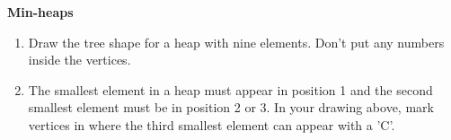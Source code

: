 \documentclass[12pt]{article}
\begin{document}
\newcommand{\I}{\mbox{{\em Int}}}
\newcommand{\lt}{\mbox{{\em left}}}
\newcommand{\rt}{\mbox{{\em right}}}
\newcommand{\ld}{\Delta^l}
\newcommand{\rd}{\Delta^r}
\newcommand{\lsp}[1]{\large\renewcommand{\baselinestretch}{#1}\normalsize}
\newcommand{\hsp}{\hspace{.2in}}

\lsp{1}
\pagestyle{plain}
\begin{center}
{\bf
Min-heaps
}
\end{center}

\begin{enumerate}
\item Draw the tree shape for a heap with nine elements. Don't put any
numbers inside the vertices.

\vspace*{2in} 

\item  
The smallest element in a heap must appear in position 1 and the second
smallest element must be in position 2 or 3. In your drawing above, 
mark vertices in where the third smallest element can appear with a 'C'.

\end{enumerate} 
\end{document}
